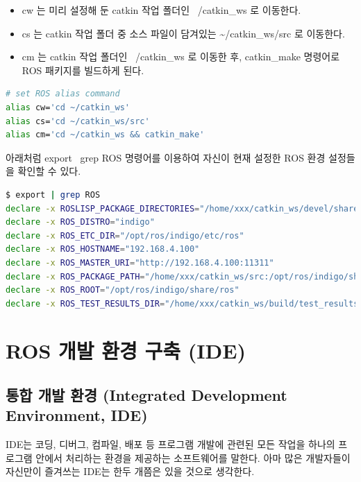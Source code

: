 \begin{itemize}[leftmargin=*]
\item cw 는 미리 설정해 둔 catkin 작업 폴더인 ~/catkin\_ws 로 이동한다. 
\item cs 는 catkin 작업 폴더 중 소스 파일이 담겨있는 \textasciitilde/catkin\_ws/src 로 이동한다. 
\item cm 는 catkin 작업 폴더인 ~/catkin\_ws 로 이동한 후, catkin\_make 명령어로 ROS 패키지를 빌드하게 된다.
\end{itemize}

\vspace{\baselineskip}
\begin{lstlisting}[language=bash]
# set ROS alias command
alias cw='cd ~/catkin_ws'
alias cs='cd ~/catkin_ws/src'
alias cm='cd ~/catkin_ws && catkin_make'
\end{lstlisting}

\begin{exercise}[ROS 환경 설정 확인 방법]
아래처럼 export \textbar~grep ROS 명령어를 이용하여 자신이 현재 설정한 ROS 환경 설정들을 확인할 수 있다.
\begin{lstlisting}[language=bash, backgroundcolor=\color{ocre!10}, numbers=none]
$ export | grep ROS
declare -x ROSLISP_PACKAGE_DIRECTORIES="/home/xxx/catkin_ws/devel/share/common-lisp"
declare -x ROS_DISTRO="indigo"
declare -x ROS_ETC_DIR="/opt/ros/indigo/etc/ros"
declare -x ROS_HOSTNAME="192.168.4.100"
declare -x ROS_MASTER_URI="http://192.168.4.100:11311"
declare -x ROS_PACKAGE_PATH="/home/xxx/catkin_ws/src:/opt/ros/indigo/share:/opt/ros/indigo/stacks"
declare -x ROS_ROOT="/opt/ros/indigo/share/ros"
declare -x ROS_TEST_RESULTS_DIR="/home/xxx/catkin_ws/build/test_results"
\end{lstlisting}
\end{exercise}

\section{ROS 개발 환경 구축 (IDE)}

\subsection{통합 개발 환경 (Integrated Development Environment, IDE)}

IDE는 코딩, 디버그, 컴파일, 배포 등 프로그램 개발에 관련된 모든 작업을 하나의 프로그램 안에서 처리하는 환경을 제공하는 소프트웨어를 말한다. 아마 많은 개발자들이 자신만이 즐겨쓰는 IDE는 한두 개쯤은 있을 것으로 생각한다. 

